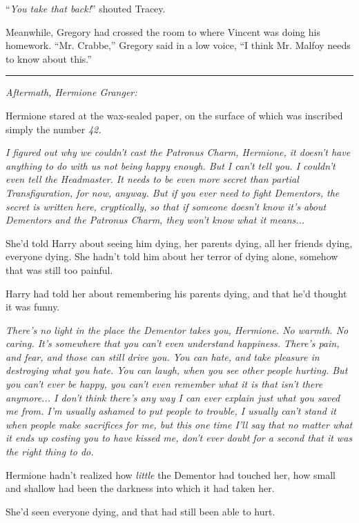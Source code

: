 ``\emph{You take that back!}'' shouted Tracey.

Meanwhile, Gregory had crossed the room to where Vincent was doing his homework. ``Mr. Crabbe,'' Gregory said in a low voice, ``I think Mr. Malfoy needs to know about this.''

\begin{center}\rule{3in}{0.4pt}\end{center}

\emph{Aftermath, Hermione Granger:}

Hermione stared at the wax-sealed paper, on the surface of which was inscribed simply the number \emph{42.}

\emph{I figured out why we couldn't cast the Patronus Charm, Hermione, it doesn't have anything to do with us not being happy enough. But I can't tell you. I couldn't even tell the Headmaster. It needs to be even more secret than partial Transfiguration, for now, anyway. But if you ever need to fight Dementors, the secret is written here, cryptically, so that if someone doesn't know it's about Dementors and the Patronus Charm, they won't know what it means...}

She'd told Harry about seeing him dying, her parents dying, all her friends dying, everyone dying. She hadn't told him about her terror of dying alone, somehow that was still too painful.

Harry had told her about remembering his parents dying, and that he'd thought it was funny.

\emph{There's no light in the place the Dementor takes you, Hermione. No warmth. No caring. It's somewhere that you can't even understand happiness. There's pain, and fear, and those can still drive you. You can hate, and take pleasure in destroying what you hate. You can laugh, when you see other people hurting. But you can't ever be happy, you can't even remember what it is that isn't there anymore... I don't think there's any way I can ever explain just what you saved me from. I'm usually ashamed to put people to trouble, I usually can't stand it when people make sacrifices for me, but this one time I'll say that no matter what it ends up costing you to have kissed me, don't ever doubt for a second that it was the right thing to do.}

Hermione hadn't realized how \emph{little} the Dementor had touched her, how small and shallow had been the darkness into which it had taken her.

She'd seen everyone dying, and that had still been able to hurt.

